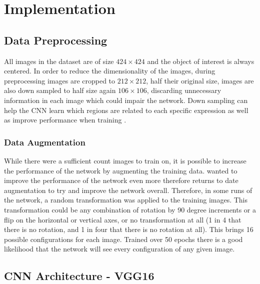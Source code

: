 \section{Implementation}


\subsection{Data Preprocessing}

All images in the dataset are of size $424\times424$ and the object of interest is always centered. In order to reduce the dimensionality of the images, during preprocessing images are cropped to $212\times212$, half their original size, images are also down sampled to half size again $ 106\times 106$, discarding unnecessary information in each image which could impair the network. Down sampling can help the CNN learn which regions are related to each specific expression as well as improve performance when training \cite{deep-learning-review}.

\subsubsection{Data Augmentation}
While there were a sufficient count images to train on, it is possible to increase the performance of the network by augmenting the training data. wanted to improve the performance of the network even more therefore returns to date augmentation to try and improve the network overall. Therefore, in some runs of the network, a random transformation was applied to the training images. This transformation could be any combination of rotation by 90 degree increments or a flip on the horizontal or vertical axes, or no transformation at all (1 in 4 that there is no rotation, and 1 in four that there is no rotation at all). This brings 16 possible configurations for each image. Trained over 50 epochs there is a good likelihood that the network will see every configuration of any given image.

\subsection{CNN Architecture - VGG16}

\newcommand{\anet}{AlexNet\xspace}
\newcommand{\gnet}{GoogLeNet\xspace}
\newcommand{\inet}{ImageNet\xspace}

